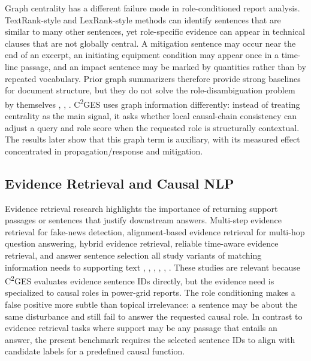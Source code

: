 \documentclass{ieeeaccess}
\begin{document}
Graph centrality has a different failure mode in role-conditioned report analysis. TextRank-style and LexRank-style methods can identify sentences that are similar to many other sentences, yet role-specific evidence can appear in technical clauses that are not globally central. A mitigation sentence may occur near the end of an excerpt, an initiating equipment condition may appear once in a time-line passage, and an impact sentence may be marked by quantities rather than by repeated vocabulary. Prior graph summarizers therefore provide strong baselines for document structure, but they do not solve the role-disambiguation problem by themselves \cite{khor2021text}, \cite{belwal2020graphbased}, \cite{setiawan2025impact}. C\textsuperscript{2}GES uses graph information differently: instead of treating centrality as the main signal, it asks whether local causal-chain consistency can adjust a query and role score when the requested role is structurally contextual. The results later show that this graph term is auxiliary, with its measured effect concentrated in propagation/response and mitigation.

\subsection{Evidence Retrieval and Causal NLP}

\label{sec:evidence_retrieval_and_causal_nlp}

Evidence retrieval research highlights the importance of returning support passages or sentences that justify downstream answers. Multi-step evidence retrieval for fake-news detection, alignment-based evidence retrieval for multi-hop question answering, hybrid evidence retrieval, reliable time-aware evidence retrieval, and answer sentence selection all study variants of matching information needs to supporting text \cite{liao2023muser}, \cite{yadav2020unsupervised}, \cite{liang2020hammer}, \cite{vladika2024improving}, \cite{zhang2022situ}, \cite{liello2022pretraining}. These studies are relevant because C\textsuperscript{2}GES evaluates evidence sentence IDs directly, but the evidence need is specialized to causal roles in power-grid reports. The role conditioning makes a false positive more subtle than topical irrelevance: a sentence may be about the same disturbance and still fail to answer the requested causal role. In contrast to evidence retrieval tasks where support may be any passage that entails an answer, the present benchmark requires the selected sentence IDs to align with candidate labels for a predefined causal function.
\end{document}
